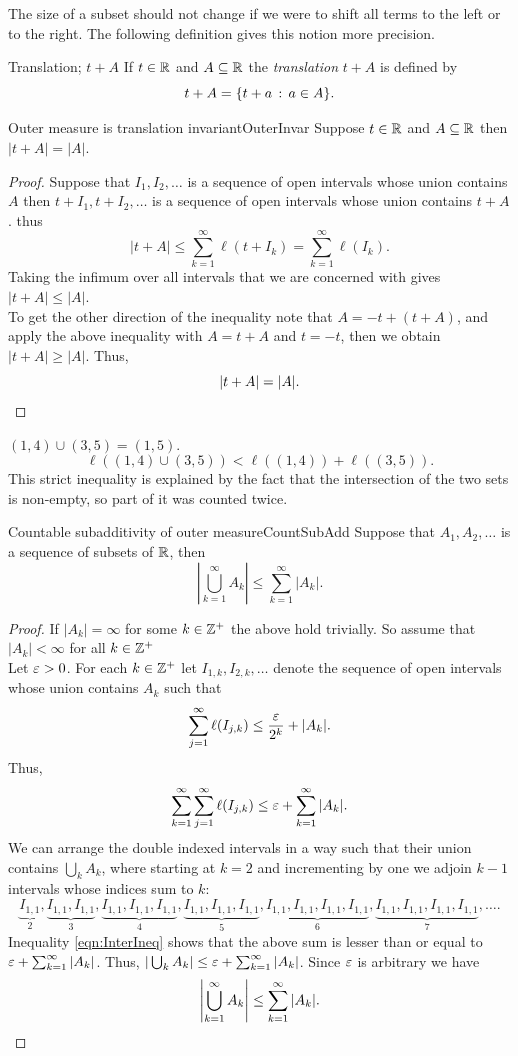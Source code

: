 \documentclass[twoside, openright, fontsize=10pt, headings=big]{scrbook}
\begin{document}
The size of a subset should not change if we were to shift all terms to the left or to the right. The following definition gives this notion more precision.
\begin{definition}{Translation; $t+A$}{}
    If $t\in\mathbb{R}$ and $A\subseteq\mathbb{R}$ the \textit{translation} $t+A$ is defined by
    \[
        t+A=\{t+a\,:\, a\in A\}.
    \]
\end{definition}
\begin{lemma}{Outer measure is translation invariant}{OuterInvar}
    Suppose $t\in\mathbb{R}$ and $A\subseteq\mathbb{R}$ then $|t+A|=|A|$.
\end{lemma}
\begin{proof}
    Suppose that $I_1,I_2,\dots$ is a sequence of open intervals whose union contains $A$ then $t+I_1,t+I_2,\dots$ is a sequence of open intervals whose union contains $t+A$. thus
    \[
        |t+A|\leq\sum_{k=1}^{\infty}\ell(t+I_k)=\sum_{k=1}^{\infty}\ell(I_k).
    \]
    Taking the infimum over all intervals that we are concerned with gives $|t+A|\leq|A|$.\\
    To get the other direction of the inequality note that $A=-t+(t+A)$, and apply the above inequality with $A=t+A$ and $t=-t$, then we obtain $|t+A|\geq|A|$. Thus, 
    \[
        |t+A|=|A|.\qedhere
    \]
\end{proof}
$(1,4)\cup(3,5)=(1,5)$. 
\[
    \ell((1,4)\cup(3,5))<\ell((1,4))+\ell((3,5)).
\]
This strict inequality is explained by the fact that the intersection of the two sets is non-empty, so part of it was counted twice.
\begin{lemma}{Countable subadditivity of outer measure}{CountSubAdd}
    Suppose that $A_1,A_2,\dots$ is a sequence of subsets of $\mathbb{R}$, then
    \[
        \left|\bigcup_{k=1}^{\infty}A_k\right|\leq\sum_{k=1}^{\infty}|A_k|.
    \]
\end{lemma}
\begin{proof}
    If $|A_k|=\infty$ for some $k\in\mathbb{Z}^+$ the above hold trivially. So assume that $|A_k|<\infty$ for all $k\in\mathbb{Z}^+$\\
    Let $\varepsilon>0$. For each $k\in\mathbb{Z}^+$ let $I_{1,k},I_{2,k},\dots$ denote the sequence of open intervals whose union contains $A_k$ such that 
    \[
        \sum_{j=1}^{\infty}\ell(I_{j,k})\leq\frac{\varepsilon}{2^k}+|A_k|.
    \]
    Thus, 
    \begin{equation}\label{eqn:InterIneq}
        \sum_{k=1}^{\infty}\sum_{j=1}^{\infty}\ell(I_{j,k})\leq\varepsilon+\sum_{k=1}^{\infty}|A_k|.
    \end{equation}
    We can arrange the double indexed intervals in a way such that their union contains $\bigcup_k A_k$, where starting at $k=2$ and incrementing by one we adjoin $k-1$ intervals whose indices sum to $k$:
    \[
        \underbrace{I_{1,1}}_2,\underbrace{I_{1,1},I_{1,1}}_3,\underbrace{I_{1,1},I_{1,1},I_{1,1}}_4,\underbrace{I_{1,1},I_{1,1},I_{1,1}}_5,\underbrace{I_{1,1},I_{1,1},I_{1,1},I_{1,1}}_6,\underbrace{I_{1,1},I_{1,1},I_{1,1},I_{1,1}}_7,\dots.
    \]
    Inequality \ref{eqn:InterIneq} shows that the above sum is lesser than or equal to $\varepsilon+\sum_{k=1}^{\infty}|A_k|$. Thus, $|\bigcup_kA_k|\leq\varepsilon+\sum_{k=1}^{\infty}|A_k|$. Since $\varepsilon$ is arbitrary we have
    \[
        \left|\bigcup_{k=1}^{\infty}A_k\right|\leq\sum_{k=1}^{\infty}|A_k|.\qedhere
    \]
\end{proof}
\end{document}
